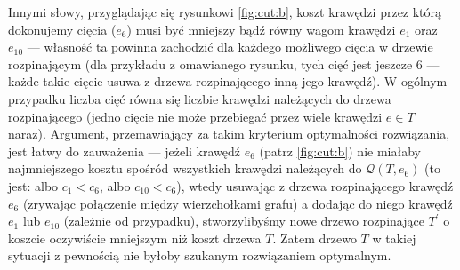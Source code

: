Innymi słowy, przyglądając się rysunkowi \ref{fig:cut:b}, koszt krawędzi przez którą dokonujemy cięcia ($e_{6}$) musi być mniejszy bądź równy wagom krawędzi $e_{1}$ oraz $e_{10}$ --- własność ta powinna zachodzić dla każdego możliwego cięcia w drzewie rozpinającym (dla przykładu z omawianego rysunku, tych cięć jest jeszcze $6$ --- każde takie cięcie usuwa z drzewa rozpinającego inną jego krawędź). W ogólnym przypadku liczba cięć równa się liczbie krawędzi należących do drzewa rozpinającego (jedno cięcie nie może przebiegać przez wiele krawędzi $e \in T$ naraz). Argument, przemawiający za takim kryterium optymalności rozwiązania, jest łatwy do zauważenia --- jeżeli krawędź $e_{6}$ (patrz \ref{fig:cut:b}) nie miałaby najmniejszego kosztu spośród wszystkich krawędzi należących do $\mathcal{Q} \left( T, e_{6} \right)$ (to jest: albo $c_{1} < c_{6}$, albo $c_{10} < c_{6}$), wtedy usuwając z drzewa rozpinającego krawędź $e_{6}$ (zrywając połączenie między wierzchołkami grafu) a dodając do niego krawędź $e_{1}$ lub $e_{10}$ (zależnie od przypadku), stworzylibyśmy nowe drzewo rozpinające $T^{\prime}$ o koszcie oczywiście mniejszym niż koszt drzewa $T$. Zatem drzewo $T$ w takiej sytuacji z pewnością nie byłoby szukanym rozwiązaniem optymalnym.

